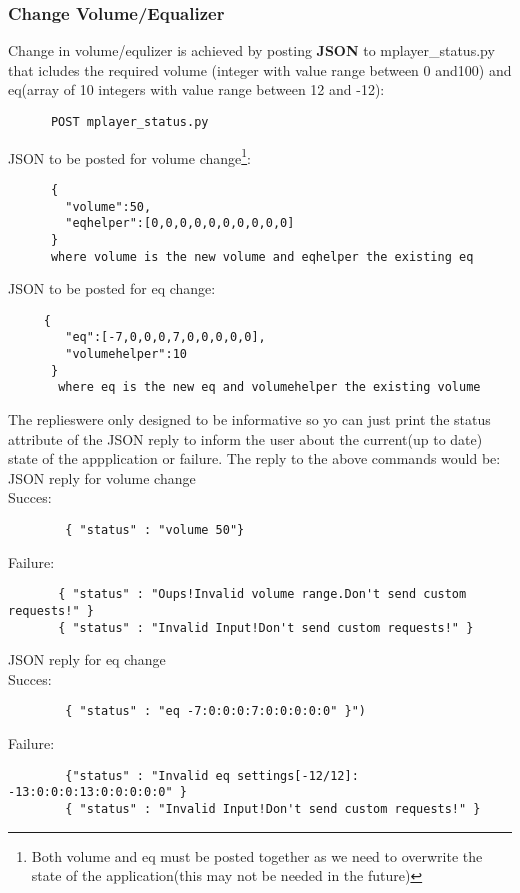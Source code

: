 \documentclass[12pt]{article}
\begin{document}
    \subsubsection{Change Volume/Equalizer}
     Change  in volume/equlizer is achieved by posting \textbf{ JSON  }to mplayer\_status.py that icludes the required volume (integer with value range between 0 and100) and eq(array of 10 integers with value range between 12 and -12):
      \begin{verbatim}
      POST mplayer_status.py
        \end{verbatim}
        JSON to be posted for volume change\footnote{Both volume and eq must be posted together as we need to overwrite the state of the application(this may not be needed in the future)}:
      \begin{verbatim}
      {
        "volume":50,
        "eqhelper":[0,0,0,0,0,0,0,0,0,0]
      }
      where volume is the new volume and eqhelper the existing eq
      \end{verbatim}
     JSON to be posted for eq change\footnotemark[4]:
     \begin{verbatim}
     {
        "eq":[-7,0,0,0,7,0,0,0,0,0],
        "volumehelper":10
      }
       where eq is the new eq and volumehelper the existing volume
      \end{verbatim}   
      The replies\footnotemark[3] were only designed to be informative so yo can just print the status attribute of the JSON reply to inform the user about the current(up to date) state of the appplication or failure. The reply to the above commands would be:\\
      JSON reply for volume change\\
      Succes:
     \begin{verbatim}
        { "status" : "volume 50"}
     \end{verbatim} 
     Failure:
     \begin{verbatim}
       { "status" : "Oups!Invalid volume range.Don't send custom requests!" }
       { "status" : "Invalid Input!Don't send custom requests!" }
     \end{verbatim}
     JSON reply for eq change\\
      Succes:    
      \begin{verbatim}
        { "status" : "eq -7:0:0:0:7:0:0:0:0:0" }")
      \end{verbatim} 
     Failure:
     \begin{verbatim}
        {"status" : "Invalid eq settings[-12/12]: -13:0:0:0:13:0:0:0:0:0" }
        { "status" : "Invalid Input!Don't send custom requests!" }
     \end{verbatim} 
     
\end{document}
